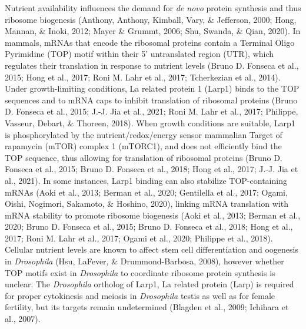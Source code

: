 \documentclass[12pt,oneside]{reedthesis}
\begin{document}
Nutrient availability influences the demand for \emph{de novo} protein synthesis and thus ribosome biogenesis (Anthony, Anthony, Kimball, Vary, \& Jefferson, 2000; Hong, Mannan, \& Inoki, 2012; Mayer \& Grummt, 2006; Shu, Swanda, \& Qian, 2020). In mammals, mRNAs that encode the ribosomal proteins contain a Terminal Oligo Pyrimidine (TOP) motif within their 5' untranslated region (UTR), which regulates their translation in response to nutrient levels (Bruno D. Fonseca et al., 2015; Hong et al., 2017; Roni M. Lahr et al., 2017; Tcherkezian et al., 2014). Under growth-limiting conditions, La related protein 1 (Larp1) binds to the TOP sequences and to mRNA caps to inhibit translation of ribosomal proteins (Bruno D. Fonseca et al., 2015; J.-J. Jia et al., 2021; Roni M. Lahr et al., 2017; Philippe, Vasseur, Debart, \& Thoreen, 2018). When growth conditions are suitable, Larp1 is phosphorylated by the nutrient/redox/energy sensor mammalian Target of rapamycin (mTOR) complex 1 (mTORC1), and does not efficiently bind the TOP sequence, thus allowing for translation of ribosomal proteins (Bruno D. Fonseca et al., 2015; Bruno D. Fonseca et al., 2018; Hong et al., 2017; J.-J. Jia et al., 2021). In some instances, Larp1 binding can also stabilize TOP-containing mRNAs (Aoki et al., 2013; Berman et al., 2020; Gentilella et al., 2017; Ogami, Oishi, Nogimori, Sakamoto, \& Hoshino, 2020), linking mRNA translation with mRNA stability to promote ribosome biogenesis (Aoki et al., 2013; Berman et al., 2020; Bruno D. Fonseca et al., 2015; Bruno D. Fonseca et al., 2018; Hong et al., 2017; Roni M. Lahr et al., 2017; Ogami et al., 2020; Philippe et al., 2018). Cellular nutrient levels are known to affect stem cell differentiation and oogenesis in \emph{Drosophila} (Hsu, LaFever, \& Drummond-Barbosa, 2008), however whether TOP motifs exist in \emph{Drosophila} to coordinate ribosome protein synthesis is unclear. The \emph{Drosophila} ortholog of Larp1, La related protein (Larp) is required for proper cytokinesis and meiosis in \emph{Drosophila} testis as well as for female fertility, but its targets remain undetermined (Blagden et al., 2009; Ichihara et al., 2007).
\end{document}
